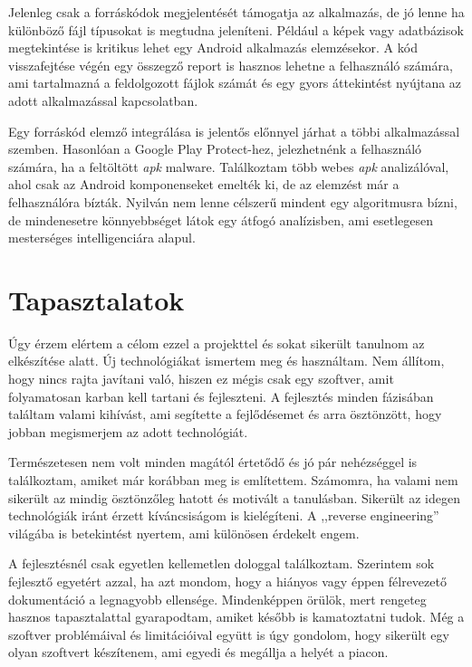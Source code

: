 \documentclass{thesis-ekf}
\theoremstyle{definition}
\theoremstyle{remark}
\begin{document}
Jelenleg csak a forráskódok megjelentését támogatja az alkalmazás, de jó lenne ha különböző fájl típusokat is megtudna jeleníteni.
Például a képek vagy adatbázisok megtekintése is kritikus lehet egy Android alkalmazás elemzésekor.
A kód visszafejtése végén egy összegző report is hasznos lehetne a felhasználó számára, ami tartalmazná a feldolgozott fájlok számát és egy gyors áttekintést nyújtana az adott alkalmazással kapcsolatban.

Egy forráskód elemző integrálása is jelentős előnnyel járhat a többi alkalmazással szemben. Hasonlóan a Google Play Protect-hez, jelezhetnénk a felhasználó számára, ha a feltöltött \emph{apk} malware.
Találkoztam több webes \emph{apk} analizálóval, ahol csak az Android komponenseket emelték ki, de az elemzést már a felhasználóra bízták.
Nyilván nem lenne célszerű mindent egy algoritmusra bízni, de mindenesetre könnyebbséget látok egy átfogó analízisben, ami esetlegesen mesterséges intelligenciára alapul.

\chapter{Tapasztalatok}\label{tapasztalatok}

Úgy érzem elértem a célom ezzel a projekttel és sokat sikerült tanulnom az elkészítése alatt.
Új technológiákat ismertem meg és használtam.
Nem állítom, hogy nincs rajta javítani való, hiszen ez mégis csak egy szoftver, amit folyamatosan karban kell tartani és fejleszteni.
A fejlesztés minden fázisában találtam valami kihívást, ami segítette a fejlődésemet és arra ösztönzött, hogy jobban megismerjem az adott technológiát.

Természetesen nem volt minden magától értetődő és jó pár nehézséggel is találkoztam, amiket már korábban meg is említettem.
Számomra, ha valami nem sikerült az mindig ösztönzőleg hatott és motivált a tanulásban.
Sikerült az idegen technológiák iránt érzett kíváncsiságom is kielégíteni.
A ,,reverse engineering'' világába is betekintést nyertem, ami különösen érdekelt engem. 

A fejlesztésnél csak egyetlen kellemetlen dologgal találkoztam. 
Szerintem sok fejlesztő egyetért azzal, ha azt mondom, hogy a hiányos vagy éppen félrevezető dokumentáció a legnagyobb ellensége.
Mindenképpen örülök, mert rengeteg hasznos tapasztalattal gyarapodtam, amiket később is kamatoztatni tudok.
Még a szoftver problémáival és limitációival együtt is úgy gondolom, hogy sikerült egy olyan szoftvert készítenem, ami egyedi és megállja a helyét a piacon. 
\end{document}
